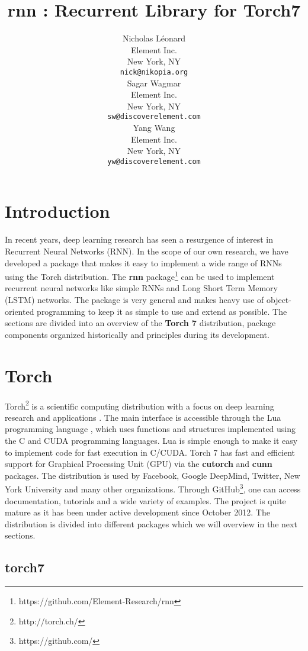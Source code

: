 \documentclass{article} %
\title{rnn : Recurrent Library for Torch7}
\author{
Nicholas L\'{e}onard \\
Element Inc.\\
New York, NY \\
\texttt{nick@nikopia.org} \\
\And
Sagar Wagmar \\
Element Inc.\\
New York, NY \\
\texttt{sw@discoverelement.com} \\
\And
Yang Wang \\
Element Inc.\\
New York, NY \\
\texttt{yw@discoverelement.com} \\
}
\begin{document}
\maketitle

\begin{abstract}

\end{abstract}
\section{Introduction}
In recent years, deep learning research has seen a resurgence of interest 
in Recurrent Neural Networks (RNN). In the scope of our own research, we
have developed a package that makes it easy to implement a wide range of RNNs using the 
Torch distribution. 
The \textbf{rnn} package\footnote{https://github.com/Element-Research/rnn} 
can be used to implement recurrent neural networks 
like simple RNNs and Long Short Term Memory (LSTM) networks.
The package is very general and makes heavy use 
of object-oriented programming to keep it as simple to use and extend as possible.
The sections are divided into an overview of the \textbf{Torch 7} distribution, 
package components organized historically and principles during its development.

\section{Torch}

Torch\footnote{http://torch.ch/} is a scientific computing distribution 
with a focus on deep learning research and applications \cite{collobert2011torch7}.
The main interface is accessible through the Lua programming language \cite{ierusalimschy1996lua},
which uses functions and structures implemented using the C and CUDA programming languages.
Lua is simple enough to make it easy to implement code for fast execution in C/CUDA. 
Torch 7 has fast and efficient support for Graphical Processing Unit (GPU)
via the \textbf{cutorch} and \textbf{cunn} packages. 
The distribution is used by Facebook, Google DeepMind, Twitter, New York University and 
many other organizations. Through GitHub\footnote{https://github.com/}, one can access documentation, tutorials and 
a wide variety of examples. The project is quite mature as it has been under active
development since October 2012. The distribution is divided into different packages 
which we will overview in the next sections.

\subsection{torch7}
\end{document}
